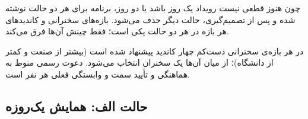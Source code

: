 \documentclass[a4paper,12pt]{article}
\newcommand{\placeholder}[1]{%
	\textcolor{mci-gold}{\textbf{[[ #1 ]]}}%
}
\newcommand{\tg}[1]{{\color{mci-gold}\footnotesize(#1)}}
\newcommand{\cands}[2]{%
	\small
	\textbf{\textcolor{mci-blue}{صنعت و پژوهشگاه کاربردی:}}~#1\par\smallskip
	\textbf{\textcolor{mci-blue}{دانشگاه:}}~#2%
}
\begin{document}
	\newcommand{\ttlQC}{\textbf{مخابرات کوانتومی} \newline \lr{QKD} در شبکه‌های مخابراتی و مالی: تجربه‌ی بین‌المللی}
	\newcommand{\cndQC}{\cands{\lr{ID Quantique} \tg{پیچ، آنلاین}؛ \lr{QNu Labs} \tg{پیچ، آنلاین}؛ \lr{LuxQuanta} \tg{پیچ، آنلاین}؛ \lr{Bahman Rashidi} (\lr{Comcast}) \tg{تجربه، آنلاین}}{دکتر رضوی (\lr{Leeds}) \tg{آنلاین}؛ \lr{Simon Devitt} (\lr{UTS}) \tg{آنلاین}}}

	\newcommand{\ttlQD}{\textbf{مخابرات کوانتومی} \newline پیچ استارتاپ‌ها: مدیریت شبکه‌ی کوانتوم‌ایمن و \lr{QKD} تجاری}
	\newcommand{\cndQD}{\cands{\lr{Qoolnet} \tg{پیچ، آنلاین}؛ \lr{Falqon Systems} \tg{پیچ، آنلاین}؛ \lr{QSECDEF} \tg{پیچ، آنلاین}}{\lr{Takuya Ikuta} (\lr{NTT}) \tg{آنلاین}؛ \lr{Ali Nawaz Ranjha} (\lr{Carleton}) \tg{آنلاین}}}

	\newcommand{\ttlPanel}{\textbf{پنل گفت‌وگو} \newline از نیاز تا محصول: بومی‌سازی امنیت پساکوانتومی و ارتباطات کوانتومی}
	\newcommand{\cndPanel}{\small
		\textbf{\textcolor{mci-blue}{مجری:}}~\placeholder{مجری پنل}\par\smallskip
		\textbf{\textcolor{mci-blue}{پنلیست‌های صنعت (۲ نفر):}}~نماینده‌ی بانک مرکزی؛ مدیرعامل نآد؛ جایگزین‌ها: \lr{Parsa Quantum}، یکی از بانک‌های بزرگ\par\smallskip
		\textbf{\textcolor{mci-blue}{پنلیست‌های دانشگاه (۲ نفر):}}~دکتر صالحی (شریف)؛ دکتر اقلیدس (شریف)؛ جایگزین‌ها: دکتر واحدی، دکتر بهرامپور}

	چون هنوز قطعی نیست رویداد یک روز باشد یا دو روز، برنامه برای هر دو حالت نوشته شده و پس از تصمیم‌گیری، حالت دیگر حذف می‌شود.
	بازه‌های سخنرانی و کاندیدهای هر بازه در هر دو حالت یکی است؛ فقط چینش آن‌ها فرق می‌کند.

	{\small\color{mci-gray}
	در هر بازه‌ی سخنرانی دست‌کم چهار کاندید پیشنهاد شده است (بیشتر از صنعت و کمتر از دانشگاه)؛ از میان آن‌ها یک سخنران انتخاب می‌شود.
	دعوت رسمی منوط به هماهنگی و تأیید سمت و وابستگی فعلی هر نفر است.}

	\subsection{حالت الف: همایش یک‌روزه}
\end{document}
